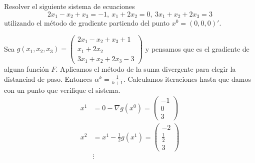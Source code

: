 \documentclass[twoside]{article}
\begin{document}
\newpage 
\begin{ejercicio}{2}%
Resolver el siguiente sistema de ecuaciones
\[
2x_1-x_2+x_3=-1,\ x_1+2x_2=0,\ 3x_1+x_2+2x_3=3
\]
utilizando el método de gradiente partiendo del punto $x^0=(0,0,0)'$.
\begin{solucion}
Sea $g(x_1,x_2,x_3)=\begin{pmatrix}
2x_1-x_2+x_3+1\\
 x_1+2x_2\\
 3x_1+x_2+2x_3-3
\end{pmatrix}$ y pensamos que es el gradiente de alguna función $F$. Aplicamos el método de la suma divergente para elegir la distanciad de paso. Entonces $\alpha^k=\frac{1}{k+1}$. Calculamos iteraciones hasta que damos con un punto que verifique el sistema.
\begin{align*}
x^1&=0-\nabla g(x^0)=\begin{pmatrix}
-1\\
0\\
3
\end{pmatrix}\\
x^2&=x^1-\frac{1}{2}g(x^1)=\begin{pmatrix}
-2\\
\frac{1}{2}\\
3
\end{pmatrix}\\
&\vdots
\end{align*}
\end{solucion}

\end{ejercicio}

\newpage 
\end{document}
